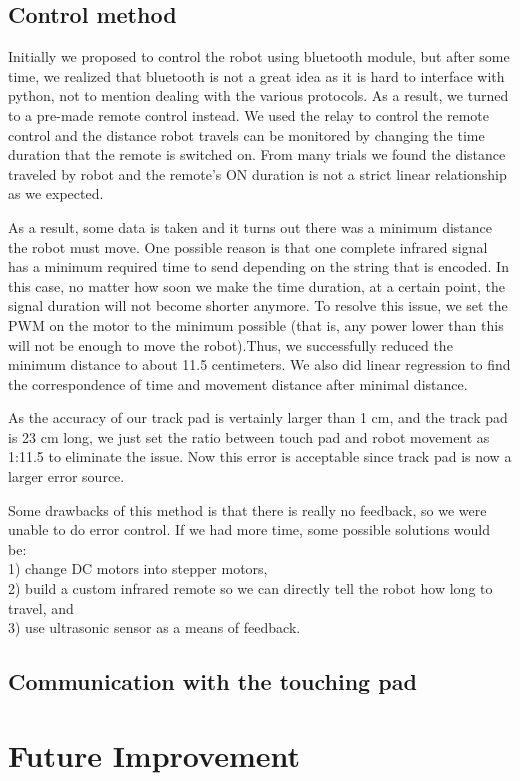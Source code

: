 \documentclass[reprint,amsmath, amsfonts, amssymb, aps, letterpaper]{revtex4-1}
\begin{document}
\subsection{Control method}
Initially we proposed to control the robot using bluetooth module, but after some time, we realized that bluetooth is not a great idea as it is hard to interface with python, not to mention dealing with the various protocols. As a result, we turned to a pre-made remote control instead. We used the relay to control the remote control and the distance robot travels can be monitored by changing the time duration that the remote is switched on. From many trials we found the distance traveled by robot and the remote's ON duration is not a strict linear relationship as we expected. 

As a result, some data is taken and it turns out there was a minimum distance the robot must move. One possible reason is that one complete infrared signal has a minimum required time to send depending on the string that is encoded. In this case, no matter how soon we make the time duration, at a certain point, the signal duration will not become shorter anymore. To resolve this issue, we set the PWM on the motor to the minimum possible (that is, any power lower than this will not be enough to move the robot).Thus, we successfully reduced the minimum distance to about 11.5 centimeters. We also did linear regression to find the correspondence of time and movement distance after minimal distance.

As the accuracy of our track pad is vertainly larger than 1 cm, and the track pad is 23 cm long, we just set the ratio between touch pad and robot movement as 1:11.5 to eliminate the issue. Now this error is acceptable since track pad is now a larger error source.

Some drawbacks of this method is that there is really no feedback, so we were unable to do error control. If we had more time, some possible solutions would be: \\
1) change DC motors into stepper motors, \\
2) build a custom infrared remote so we can directly tell the robot how long to travel, and \\
3) use ultrasonic sensor as a means of feedback.
\subsection{Communication with the touching pad}


\section{Future Improvement}
\end{document}
